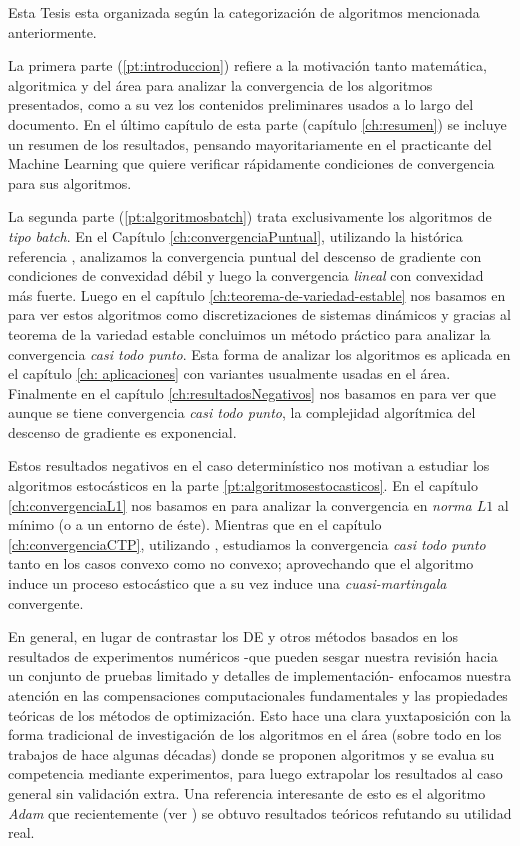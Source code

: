 Esta Tesis esta organizada seg\'un la categorizaci\'on de algoritmos mencionada anteriormente.

La primera parte (\ref{pt:introduccion}) refiere a la motivaci\'on tanto matem\'atica, algoritmica y del \'area para analizar la convergencia de los algoritmos presentados, como a su vez los contenidos preliminares usados a lo largo del documento. En el \'ultimo cap\'itulo de esta parte (cap\'itulo \ref{ch:resumen}) se incluye un resumen de los resultados, pensando mayoritariamente  en el practicante del Machine Learning que quiere verificar r\'apidamente condiciones de convergencia para sus algoritmos.

La segunda parte (\ref{pt:algoritmosbatch}) trata exclusivamente los algoritmos de \textit{tipo batch}. En el Cap\'itulo \ref{ch:convergenciaPuntual}, utilizando la hist\'orica referencia \cite{nesterov:2004}, analizamos la convergencia puntual del descenso de gradiente con condiciones de convexidad d\'ebil y luego la convergencia \textit{lineal} con convexidad m\'as fuerte. Luego en el cap\'itulo \ref{ch:teorema-de-variedad-estable} nos basamos en \cite{lee:2017} para ver estos algoritmos como discretizaciones de sistemas din\'amicos y gracias al teorema de la variedad estable concluimos un m\'etodo pr\'actico para analizar la convergencia \textit{casi todo punto}. Esta forma de analizar los algoritmos es aplicada en el cap\'itulo \ref{ch: aplicaciones} con variantes usualmente usadas en el \'area. Finalmente en el cap\'itulo \ref{ch:resultadosNegativos} nos basamos en \cite{du:2017} para ver que aunque se tiene convergencia \textit{casi todo punto}, la complejidad algor\'itmica del descenso de gradiente es exponencial.

Estos resultados negativos en el caso determin\'istico nos motivan a estudiar los algoritmos estoc\'asticos en la parte \ref{pt:algoritmosestocasticos}. En el cap\'itulo \ref{ch:convergenciaL1} nos basamos en \cite{bottou:2016} para analizar la convergencia en \textit{norma $L1$} al m\'inimo (o a un entorno de \'este). Mientras que en el cap\'itulo \ref{ch:convergenciaCTP}, utilizando \cite{bottou:1999}, estudiamos la convergencia \textit{casi todo punto} tanto en los casos convexo como no convexo; aprovechando que el algoritmo induce un proceso estoc\'astico que a su vez induce una \textit{cuasi-martingala} convergente. 

En general, en lugar de contrastar los DE y otros m\'etodos basados en los resultados de experimentos num\'ericos -que pueden sesgar nuestra revisi\'on hacia un conjunto de pruebas limitado y detalles de implementaci\'on- enfocamos nuestra atenci\'on en las compensaciones computacionales fundamentales y las propiedades te\'oricas de los m\'etodos de optimizaci\'on. Esto hace una clara yuxtaposici\'on con la forma tradicional de investigaci\'on de los algoritmos en el \'area (sobre todo en los trabajos de hace algunas d\'ecadas) donde se proponen algoritmos y se evalua su competencia mediante experimentos, para luego extrapolar los resultados al caso general sin validaci\'on extra. Una referencia interesante de esto es el algoritmo \textit{Adam} que recientemente (ver \cite{wilson:2017}) se obtuvo resultados te\'oricos refutando su utilidad real.